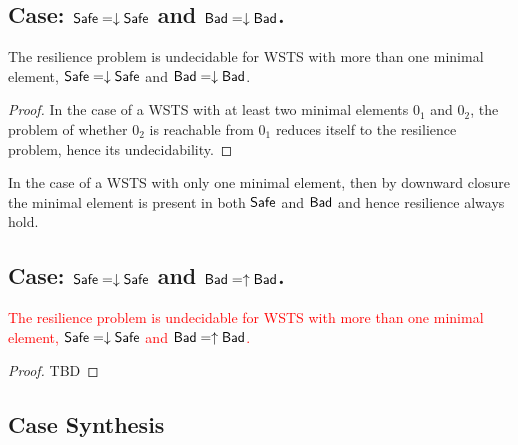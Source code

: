 %




\subsection{Case: $\textsf{Safe}=\downarrow \textsf{Safe}$ and $\textsf{Bad}=\downarrow \textsf{Bad}$.}


\begin{theorem}\label{down-down}
The resilience problem is undecidable for WSTS with more than one minimal element, 
$\textsf{Safe}=\downarrow \textsf{Safe}$
and $\textsf{Bad}=\downarrow \textsf{Bad}$.
\end{theorem}

\begin{proof}
In the case of a WSTS with at least two minimal elements $0_1$ and $0_2$, the problem of whether $0_2$ is reachable from $0_1$ reduces itself to the resilience problem, hence its undecidability.  
\end{proof}

In the case of a WSTS with only one minimal element,  
then by downward closure the minimal element is present in both $\textsf{Safe}$ and $\textsf{Bad}$ and hence resilience always hold.






\subsection{Case: $\textsf{Safe}=\downarrow \textsf{Safe}$ and $\textsf{Bad}=\uparrow \textsf{Bad}$.}
%
%

\begin{theorem}\label{up-down}
\textcolor{red}{
The resilience problem is undecidable for WSTS with more than one minimal element, 
$\textsf{Safe}=\downarrow \textsf{Safe}$
and $\textsf{Bad}=\uparrow \textsf{Bad}$.
}
\end{theorem}

\begin{proof}
TBD
\end{proof}


\subsection{Case Synthesis}




